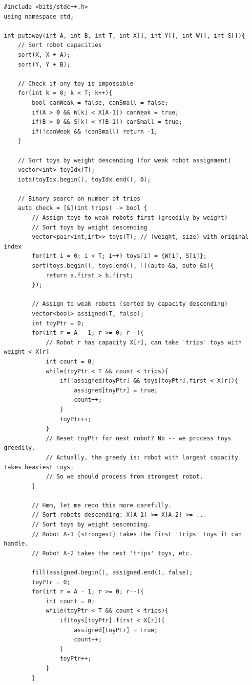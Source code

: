 \documentclass[11pt,a4paper]{article}
\begin{document}
\begin{lstlisting}
#include <bits/stdc++.h>
using namespace std;

int putaway(int A, int B, int T, int X[], int Y[], int W[], int S[]){
    // Sort robot capacities
    sort(X, X + A);
    sort(Y, Y + B);

    // Check if any toy is impossible
    for(int k = 0; k < T; k++){
        bool canWeak = false, canSmall = false;
        if(A > 0 && W[k] < X[A-1]) canWeak = true;
        if(B > 0 && S[k] < Y[B-1]) canSmall = true;
        if(!canWeak && !canSmall) return -1;
    }

    // Sort toys by weight descending (for weak robot assignment)
    vector<int> toyIdx(T);
    iota(toyIdx.begin(), toyIdx.end(), 0);

    // Binary search on number of trips
    auto check = [&](int trips) -> bool {
        // Assign toys to weak robots first (greedily by weight)
        // Sort toys by weight descending
        vector<pair<int,int>> toys(T); // (weight, size) with original index
        for(int i = 0; i < T; i++) toys[i] = {W[i], S[i]};
        sort(toys.begin(), toys.end(), [](auto &a, auto &b){
            return a.first > b.first;
        });

        // Assign to weak robots (sorted by capacity descending)
        vector<bool> assigned(T, false);
        int toyPtr = 0;
        for(int r = A - 1; r >= 0; r--){
            // Robot r has capacity X[r], can take 'trips' toys with weight < X[r]
            int count = 0;
            while(toyPtr < T && count < trips){
                if(!assigned[toyPtr] && toys[toyPtr].first < X[r]){
                    assigned[toyPtr] = true;
                    count++;
                }
                toyPtr++;
            }
            // Reset toyPtr for next robot? No -- we process toys greedily.
            // Actually, the greedy is: robot with largest capacity takes heaviest toys.
            // So we should process from strongest robot.
        }

        // Hmm, let me redo this more carefully.
        // Sort robots descending: X[A-1] >= X[A-2] >= ...
        // Sort toys by weight descending.
        // Robot A-1 (strongest) takes the first 'trips' toys it can handle.
        // Robot A-2 takes the next 'trips' toys, etc.

        fill(assigned.begin(), assigned.end(), false);
        toyPtr = 0;
        for(int r = A - 1; r >= 0; r--){
            int count = 0;
            while(toyPtr < T && count < trips){
                if(toys[toyPtr].first < X[r]){
                    assigned[toyPtr] = true;
                    count++;
                }
                toyPtr++;
            }
        }


\end{lstlisting}
\end{document}
